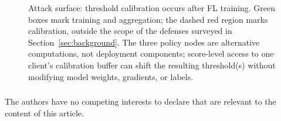 \documentclass[runningheads]{llncs}
\begin{document}
\begin{figure}[tb]
{%
}
\caption{Attack surface: threshold calibration occurs after FL training.
Green boxes mark training and aggregation; the dashed red region marks calibration, outside the scope of the defenses surveyed in Section~\ref{sec:background}.
The three policy nodes are alternative computations, not deployment components; score-level access to one client's calibration buffer can shift the resulting threshold(s) without modifying model weights, gradients, or labels.}
\label{fig:attack-surface}
\end{figure}









\begin{credits}
\subsubsection{\discintname}
The authors have no competing interests to declare that are relevant to the content of this article.
\end{credits}



\end{document}

